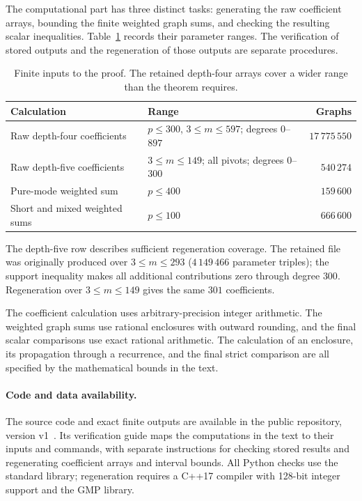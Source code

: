 \documentclass[11pt]{amsart}
\theoremstyle{definition}
\theoremstyle{remark}
\numberwithin{equation}{section}
\begin{document}
The computational part has three distinct tasks: generating the raw
coefficient arrays, bounding the finite weighted graph sums, and checking
the resulting scalar inequalities. Table~\ref{tab:computations}
records their parameter ranges. The verification of stored outputs and
the regeneration of those outputs are separate procedures.


\begin{table}[ht]
\centering\small
\caption{Finite inputs to the proof. The retained depth-four arrays
cover a wider range than the theorem requires.}
\label{tab:computations}
\begin{tabular}{@{}p{}p{}r@{}}
\toprule
Calculation & Range & Graphs\\
\midrule
Raw depth-four coefficients & $p\le300$, $3\le m\le597$;
degrees $0$--$897$ & $17\,775\,550$\\
Raw depth-five coefficients & $3\le m\le149$; all pivots;
degrees $0$--$300$ & $540\,274$\\
Pure-mode weighted sum & $p\le400$ & $159\,600$\\
Short and mixed weighted sums & $p\le100$ & $666\,600$\\
\bottomrule
\end{tabular}
\end{table}


The depth-five row describes sufficient regeneration coverage.
The retained file was originally produced over $3\le m\le293$
($4\,149\,466$ parameter triples); the support inequality makes all
additional contributions zero through degree $300$. Regeneration over
$3\le m\le149$ gives the same $301$ coefficients.

The coefficient calculation uses arbitrary-precision integer arithmetic.
The weighted graph sums use rational enclosures with outward rounding,
and the final scalar comparisons use exact rational arithmetic.
The calculation of an enclosure, its propagation through a recurrence,
and the final strict comparison are all specified by the mathematical
bounds in the text.

\paragraph{Code and data availability.}
The source code and exact finite outputs are available in the public
repository, version v1~\cite{LiuCompanion}. Its verification guide maps
the computations in the text to their inputs and commands, with separate
instructions for checking stored results and regenerating coefficient
arrays and interval bounds. All Python checks use the standard library;
regeneration requires a C++17 compiler with 128-bit integer support and
the GMP library.
\end{document}
